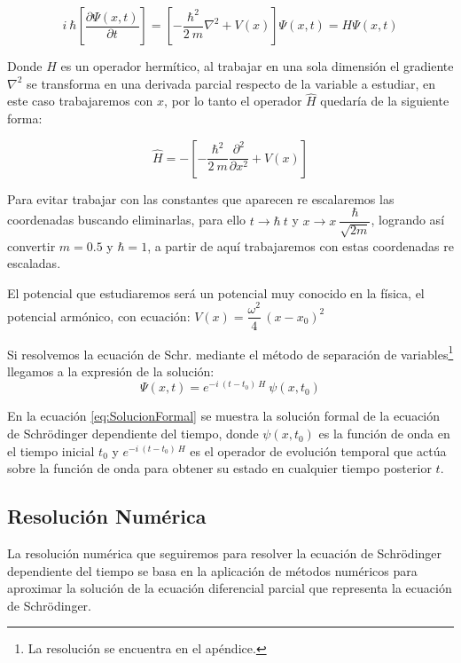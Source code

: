 \documentclass[10pt,onecolumn]{article}
\begin{document}
\begin{equation}
    i\ \hbar [\dfrac{\partial \Psi(x,t)}{\partial t}] = [-\dfrac{\hbar^2}{2\ m}\nabla^2 + V(x)]\Psi(x,t) = H \Psi(x,t)
\end{equation}

Donde $H$ es un operador hermítico, al trabajar en una sola dimensión el gradiente $\nabla^2$ se transforma en una derivada parcial respecto de la variable a estudiar, en este caso trabajaremos con $x$, por lo tanto el operador $\hat{H}$ quedaría de la siguiente forma:

\begin{equation}\label{eq:Operador_H}
\hat{H} = - [-\dfrac{\hbar^2}{2\ m}\dfrac{\partial^2}{\partial x ^2} + V(x) ]   
\end{equation}

Para evitar trabajar con las constantes que aparecen re escalaremos las coordenadas buscando eliminarlas, para ello $t\rightarrow \hbar\ t$ y $x\rightarrow x\ \dfrac{\hbar}{\sqrt{2m}}$, logrando así convertir $m = 0.5$ y $\hbar = 1$, a partir de aquí trabajaremos con estas coordenadas re escaladas.


El potencial que estudiaremos será un potencial muy conocido en la física, el potencial armónico, con ecuación: $V(x)=\dfrac{\omega^{2}}{4}\,{}(x-x_{0})^{2}$

Si resolvemos la ecuación de Schr. mediante el método de separación de variables\footnote{La resolución se encuentra en el apéndice.} llegamos a la expresión de la solución:
\begin{equation}\label{eq:SolucionFormal}
    \Psi(x,t)= e^{-i\ (t-t_0)\  H}\ \psi(x,t_0)
\end{equation}

En la ecuación \ref{eq:SolucionFormal} se muestra la solución formal de la ecuación de Schrödinger dependiente del tiempo, donde $\psi(x,t_0)$ es la función de onda en el tiempo inicial $t_0$ y $e^{-i\ (t-t_0)\  H}$ es el operador de evolución temporal que actúa sobre la función de onda para obtener su estado en cualquier tiempo posterior $t$.

\subsection{Resolución Numérica}

La resolución numérica que seguiremos para resolver la ecuación de Schrödinger dependiente del tiempo se basa en la aplicación de métodos numéricos para aproximar la solución de la ecuación diferencial parcial que representa la ecuación de Schrödinger.
\end{document}
